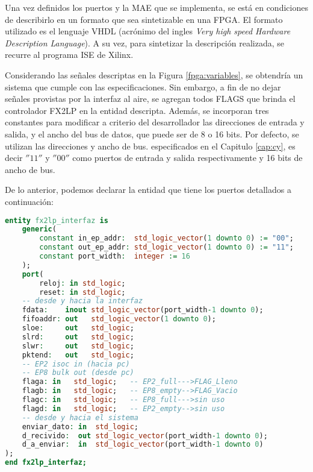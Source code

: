 Una vez definidos los puertos y la MAE que se implementa, se está en condiciones de describirlo en un formato que sea sintetizable en una FPGA. El formato utilizado es el lenguaje VHDL (acrónimo del ingles {\it Very high speed Hardware Description Language}). A su vez, para sintetizar la descripción realizada, se recurre al programa ISE de Xilinx.

Considerando las señales descriptas en la Figura \ref{fpga:variables}, se obtendría un sistema que cumple con las especificaciones. Sin embargo, a fin de no dejar señales provistas por la interfaz al aire, se agregan todos FLAGS que brinda el controlador FX2LP en la entidad descripta. Además, se incorporan tres constantes para modificar a criterio del desarrollador las direcciones de entrada y salida, y el ancho del bus de datos, que puede ser de 8 o 16 bits. Por defecto, se utilizan las direcciones y ancho de bus. especificados en el Capitulo \ref{cap:cy}, es decir $''11''$ y $''00''$ como puertos de entrada y salida respectivamente y 16 bits de ancho de bus.

De lo anterior, podemos declarar la entidad que tiene los puertos detallados a continuación:

\begin{lstlisting}[language=VHDL,backgroundcolor=\color{gray!30}]
entity fx2lp_interfaz is
	generic(
		constant in_ep_addr:  std_logic_vector(1 downto 0) := "00";
		constant out_ep_addr: std_logic_vector(1 downto 0) := "11";
		constant port_width:  integer := 16
	);
	port(
		reloj: in std_logic;
		reset: in std_logic;
	-- desde y hacia la interfaz
	fdata:    inout std_logic_vector(port_width-1 downto 0);
	fifoaddr: out	std_logic_vector(1 downto 0);
	sloe: 	  out	std_logic;
	slrd:     out	std_logic;
	slwr:     out	std_logic;
	pktend:   out	std_logic;
	-- EP2 isoc in (hacia pc)
	-- EP8 bulk out (desde pc)
	flaga: in	std_logic;   -- EP2_full--->FLAG_Lleno
	flagb: in	std_logic;   -- EP8_empty-->FLAG_Vacio
	flagc: in	std_logic;   -- EP8_full--->sin uso
	flagd: in	std_logic;   -- EP2_empty-->sin uso
	-- desde y hacia el sistema
	enviar_dato: in  std_logic;
	d_recivido:  out std_logic_vector(port_width-1 downto 0);
	d_a_enviar:  in  std_logic_vector(port_width-1 downto 0)
);
end fx2lp_interfaz;
\end{lstlisting}

